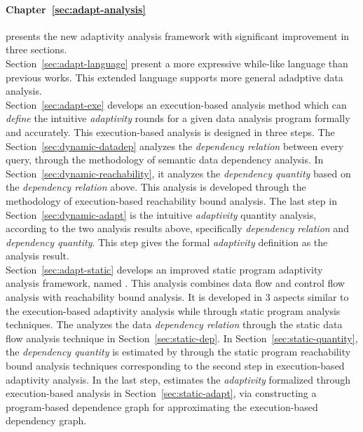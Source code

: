 \begin{enumerate}
    \paragraph*{Chapter~\ref{sec:adapt-analysis}} presents the new adaptivity analysis framework with significant improvement in three sections.
    \\
    Section~\ref{sec:adapt-language} present a more expressive while-like language than previous works. This extended language supports more general adadptive data analysis.
    \\
    Section~\ref{sec:adapt-exe}  develops an execution-based analysis method which can
    \emph{define} the intuitive \emph{adaptivity} rounds for a given data analysis program formally and accurately.
    This execution-based analysis is designed in three steps. The Section~\ref{sec:dynamic-datadep} analyzes the \emph{dependency relation} between every query, 
    through the methodology of semantic data dependency analysis. In Section~\ref{sec:dynamic-reachability}, it analyzes the \emph{dependency quantity} 
    based on the \emph{dependency relation} above.
    This analysis is developed through the methodology of execution-based reachability bound analysis.
    The last step in Section~\ref{sec:dynamic-adapt} is the intuitive \emph{adaptivity} quantity analysis, 
   according to the two analysis results above, specifically \emph{dependency relation} and \emph{dependency quantity}.
    This step 
    gives the formal \emph{adaptivity} definition as the analysis result. 
    \\
    Section~\ref{sec:adapt-static} develops an improved static program adaptivity analysis framework, named {\THESYSTEM}.
    This analysis combines data flow and control flow analysis with reachability bound analysis.
    It is developed in 3 aspects similar to the execution-based adaptivity analysis 
    while through static program analysis techniques. 
    The {\THESYSTEM} analyzes the data \emph{dependency relation} through the static data flow analysis technique
    in Section~\ref{sec:static-dep}.
    In Section~\ref{sec:static-quantity}, the \emph{dependency quantity} 
    is estimated by {\THESYSTEM} through the static program reachability bound analysis techniques corresponding to the second step in execution-based adaptivity analysis.
    In the last step, {\THESYSTEM}
    estimates the \emph{adaptivity} formalized through execution-based analysis in Section~\ref{sec:static-adapt},
    via constructing a program-based dependence graph for approximating the execution-based dependency graph.
    


\end{enumerate}
